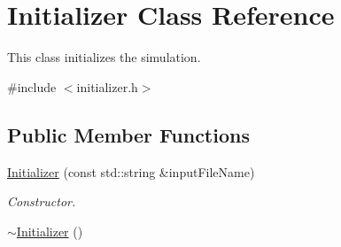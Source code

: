\hypertarget{classInitializer}{\section{Initializer Class Reference}
\label{classInitializer}
}


This class initializes the simulation.  




{\ttfamily \#include $<$initializer.\-h$>$}

\subsection*{Public Member Functions}
\begin{DoxyCompactItemize}
\item 
\hyperlink{classInitializer_ad2bebb491fabcaec13ae64528fcdbf49}{Initializer} (const std\-::string \&input\-File\-Name)
\begin{DoxyCompactList}\small\item\em Constructor. \end{DoxyCompactList}\item 
\hypertarget{classInitializer_add39a548b1e5405e938e786f069191e1}{\hyperlink{classInitializer_add39a548b1e5405e938e786f069191e1}{$\sim$\-Initializer} ()}\label{classInitializer_add39a548b1e5405e938e786f069191e1}


\end{DoxyCompactItemize}
